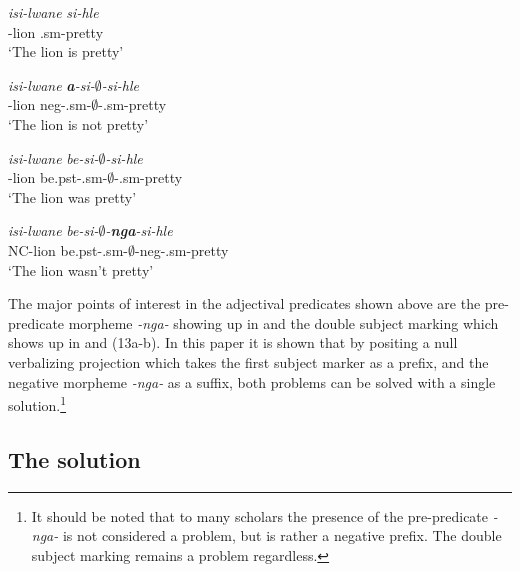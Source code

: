 \documentclass[output=paper]{langsci/langscibook}
\newcommand{\nga}[0]{\textit{-nga- }}
\begin{document}
\begin{exe}
\ex\label{ex:burkholder:12} \begin{xlist}
\ex\label{ex:burkholder:12a} \gll \textit{isi-lwane} \textit{si-hle}\\
       -lion .{\sc sm}-pretty\\
    \glt `The lion is pretty' 

\ex\label{ex:burkholder:12b} \gll \textit{isi-lwane} \textit{\textbf{a}-si-$\emptyset$-si-hle}\\
       -lion {\sc neg}-.{\sc sm}-$\emptyset$-.{\sc sm}-pretty\\
    \glt `The lion is not pretty' 
\end{xlist}
\end{exe}

\begin{exe}
\ex\label{ex:burkholder:13} \begin{xlist}
\ex\label{ex:burkholder:13a} \gll \textit{isi-lwane} \textit{be-si-$\emptyset$-si-hle}\\
       -lion be.{\sc pst}-.{\sc sm}-$\emptyset$-.{\sc sm}-pretty\\
    \glt `The lion was pretty' 

\ex\label{ex:burkholder:13b} \gll \textit{isi-lwane} \textit{be-si-$\emptyset$-\textbf{nga}-si-hle}\\
       NC-lion be.{\sc pst}-.{\sc sm}-$\emptyset$-{\sc neg}-.{\sc sm}-pretty\\
    \glt `The lion wasn't pretty' 
\end{xlist}
\end{exe}

The major points of interest in the adjectival predicates shown above are the pre-predicate morpheme \nga showing up in  and the double subject marking which shows up in  and (13a-b). In this paper it is shown that by positing a null verbalizing projection which takes the first subject marker as a prefix, and the negative morpheme \nga as a suffix, both problems can be solved with a single solution.\footnote{It should be noted that to many scholars the presence of the pre-predicate \nga is not considered a problem, but is rather a negative prefix. The double subject marking remains a problem regardless.}

\subsection {The solution}\label{sec:burkholder:3.2}
\end{document}
